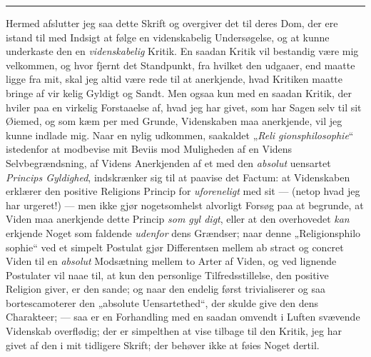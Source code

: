 \begin{center}\rule{2cm}{0.4pt}\end{center}

Hermed afslutter jeg saa dette Skrift og overgiver det til deres Dom, der ere
istand til med Indsigt at følge en videnskabelig Undersøgelse, og at kunne
underkaste den en \emph{videnskabelig} Kritik. En saadan Kritik vil bestandig
være mig velkommen, og hvor fjernt det Standpunkt, fra hvilket den udgaaer, end
maatte ligge fra mit, skal jeg altid være rede til at anerkjende, hvad Kritiken
maatte bringe af vir\-%
kelig Gyldigt og Sandt. Men ogsaa kun med en saadan Kritik, der hviler paa en
virkelig Forstaaelse af, hvad jeg har givet, som har Sagen selv til sit Øiemed,
og som kæm\-%
per med Grunde, Videnskaben maa anerkjende, vil jeg kunne indlade mig. Naar en
nylig udkommen, saakaldet „\emph{Reli\-%
gionsphilosophie}“ istedenfor at modbevise mit Beviis mod Muligheden af en Videns
Selvbegrændsning, af Videns Anerkjenden af et med den \emph{absolut} uensartet
\emph{Princips Gyldighed}, indskrænker sig til at paavise det Factum:
 at Videnskaben erklærer den positive Religions Princip for \emph{uforeneligt} med
sit --- (netop hvad jeg har urgeret!) --- men ikke gjør nogetsomhelst alvorligt
Forsøg paa at begrunde, at Viden maa anerkjende dette Princip \emph{som gyl\-%
digt}, eller at den overhovedet \emph{kan} erkjende Noget som faldende
\emph{udenfor} dens Grændser; naar denne „Religionsphilo\-%
sophie“ ved et simpelt Postulat gjør Differentsen mellem ab\-%
stract og concret Viden til en \emph{absolut} Modsætning mellem to Arter af
Viden, og ved lignende Postulater vil naae til, at kun den personlige
Tilfredsstillelse, den positive Religion giver, er den sande; og naar den endelig
først trivialiserer og saa bortescamoterer den „absolute Uensartethed“, der
skulde give den dens Charakteer; --- saa er en Forhandling med en saadan omvendt
i Luften svævende Videnskab overflødig; der er simpelthen at vise tilbage til den
Kritik, jeg har givet af den i mit tidligere Skrift; der behøver ikke at føies
Noget dertil.

